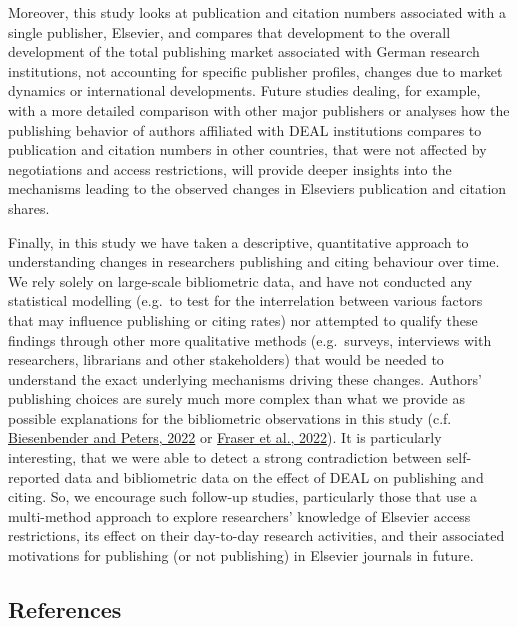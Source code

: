 \documentclass[
]{article}
\begin{document}
Moreover, this study looks at publication and citation numbers associated with a single publisher, Elsevier, and compares that development to the overall development of the total publishing market associated with German research institutions, not accounting for specific publisher profiles, changes due to market dynamics or international developments. Future studies dealing, for example, with a more detailed comparison with other major publishers or analyses how the publishing behavior of authors affiliated with DEAL institutions compares to publication and citation numbers in other countries, that were not affected by negotiations and access restrictions, will provide deeper insights into the mechanisms leading to the observed changes in Elseviers publication and citation shares.

Finally, in this study we have taken a descriptive, quantitative approach to understanding changes in researchers publishing and citing behaviour over time. We rely solely on large-scale bibliometric data, and have not conducted any statistical modelling (e.g.~to test for the interrelation between various factors that may influence publishing or citing rates) nor attempted to qualify these findings through other more qualitative methods (e.g.~surveys, interviews with researchers, librarians and other stakeholders) that would be needed to understand the exact underlying mechanisms driving these changes. Authors' publishing choices are surely much more complex than what we provide as possible explanations for the bibliometric observations in this study (c.f. \href{https://doi.org/10.5281/zenodo.6974779}{Biesenbender and Peters, 2022} or \href{https://journals.plos.org/plosone/article?id=10.1371/journal.pone.0274441}{Fraser et al., 2022}). It is particularly interesting, that we were able to detect a strong contradiction between self-reported data and bibliometric data on the effect of DEAL on publishing and citing. So, we encourage such follow-up studies, particularly those that use a multi-method approach to explore researchers' knowledge of Elsevier access restrictions, its effect on their day-to-day research activities, and their associated motivations for publishing (or not publishing) in Elsevier journals in future.

\hypertarget{references}{%
\subsection{References}\label{references}}
\end{document}
